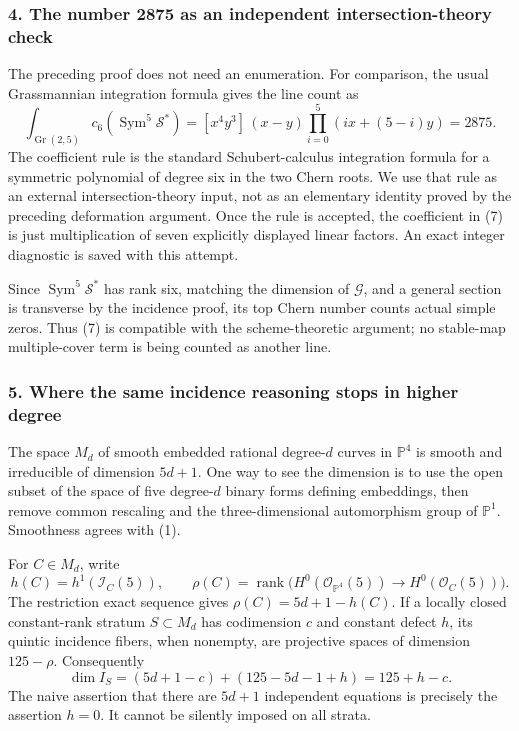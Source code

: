 \documentclass[11pt]{article}
\begin{document}
\subsubsection{4. The number 2875 as an independent intersection-theory check}
The preceding proof does not need an enumeration. For comparison, the usual Grassmannian integration formula gives the line count as
\[
 \int_{\operatorname{Gr}(2,5)}c_6(\operatorname{Sym}^5\mathcal S^*)
 =[x^4y^3]\,(x-y)\prod_{i=0}^{5}(ix+(5-i)y)=2875.       \tag{7}
\]
The coefficient rule is the standard Schubert-calculus integration formula for a symmetric polynomial of degree six in the two Chern roots. We use that rule as an external intersection-theory input, not as an elementary identity proved by the preceding deformation argument. Once the rule is accepted, the coefficient in (7) is just multiplication of seven explicitly displayed linear factors. An exact integer diagnostic is saved with this attempt.

Since $\operatorname{Sym}^5\mathcal S^*$ has rank six, matching the dimension of $\mathcal G$, and a general section is transverse by the incidence proof, its top Chern number counts actual simple zeros. Thus (7) is compatible with the scheme-theoretic argument; no stable-map multiple-cover term is being counted as another line.

\subsubsection{5. Where the same incidence reasoning stops in higher degree}
The space $M_d$ of smooth embedded rational degree-$d$ curves in $\mathbb P^4$ is smooth and irreducible of dimension $5d+1$. One way to see the dimension is to use the open subset of the space of five degree-$d$ binary forms defining embeddings, then remove common rescaling and the three-dimensional automorphism group of $\mathbb P^1$. Smoothness agrees with (1).

For $C\in M_d$, write
\[
 h(C)=h^1(\mathcal I_C(5)),\qquad
 \rho(C)=\operatorname{rank}\bigl(H^0(\mathcal O_{\mathbb P^4}(5))
                   \to H^0(\mathcal O_C(5))\bigr).
\]
The restriction exact sequence gives
$\rho(C)=5d+1-h(C)$. If a locally closed constant-rank stratum $S\subset M_d$ has codimension $c$ and constant defect $h$, its quintic incidence fibers, when nonempty, are projective spaces of dimension $125-\rho$. Consequently
\[
 \dim I_S=(5d+1-c)+(125-5d-1+h)=125+h-c.               \tag{8}
\]
The naive assertion that there are $5d+1$ independent equations is precisely the assertion $h=0$. It cannot be silently imposed on all strata.
\end{document}
